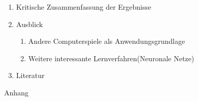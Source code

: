 \documentclass[12pt,a4paper]{scrartcl}
\begin{document}
\begin{enumerate}
	\item Kritische Zusammenfassung der Ergebnisse

	\item Ausblick
	\begin{enumerate}
		\item Andere Computerspiele als Anwendungsgrundlage
		\item Weitere interessante Lernverfahren(Neuronale Netze)
	\end{enumerate}			
	
	\item Literatur	
\end{enumerate}
Anhang


\nocite{*}
\printbibliography
\end{document}
